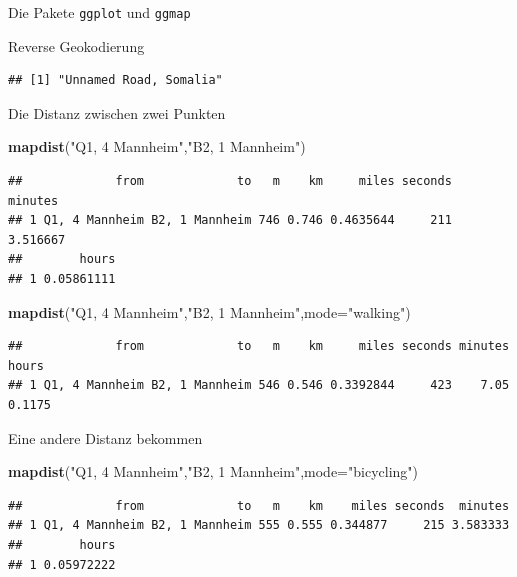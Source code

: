 \documentclass[ignorenonframetext,]{beamer}
\newenvironment{Shaded}{}{}
\newcommand{\KeywordTok}[1]{\textcolor[rgb]{0.00,0.44,0.13}{\textbf{{#1}}}}
\newcommand{\DataTypeTok}[1]{\textcolor[rgb]{0.56,0.13,0.00}{{#1}}}
\newcommand{\StringTok}[1]{\textcolor[rgb]{0.25,0.44,0.63}{{#1}}}
\newcommand{\NormalTok}[1]{{#1}}
\begin{document}
\begin{frame}[fragile]{Die Pakete \texttt{ggplot} und \texttt{ggmap}}
\begin{block}{Reverse Geokodierung}
\begin{verbatim}
## [1] "Unnamed Road, Somalia"
\end{verbatim}

\end{block}

\begin{block}{Die Distanz zwischen zwei Punkten}

\begin{Shaded}
\begin{Highlighting}[]
\KeywordTok{mapdist}\NormalTok{(}\StringTok{"Q1, 4 Mannheim"}\NormalTok{,}\StringTok{"B2, 1 Mannheim"}\NormalTok{)}
\end{Highlighting}
\end{Shaded}

\begin{verbatim}
##             from             to   m    km     miles seconds  minutes
## 1 Q1, 4 Mannheim B2, 1 Mannheim 746 0.746 0.4635644     211 3.516667
##        hours
## 1 0.05861111
\end{verbatim}

\begin{Shaded}
\begin{Highlighting}[]
\KeywordTok{mapdist}\NormalTok{(}\StringTok{"Q1, 4 Mannheim"}\NormalTok{,}\StringTok{"B2, 1 Mannheim"}\NormalTok{,}\DataTypeTok{mode=}\StringTok{"walking"}\NormalTok{)}
\end{Highlighting}
\end{Shaded}

\begin{verbatim}
##             from             to   m    km     miles seconds minutes  hours
## 1 Q1, 4 Mannheim B2, 1 Mannheim 546 0.546 0.3392844     423    7.05 0.1175
\end{verbatim}

\end{block}

\begin{block}{Eine andere Distanz bekommen}

\begin{Shaded}
\begin{Highlighting}[]
\KeywordTok{mapdist}\NormalTok{(}\StringTok{"Q1, 4 Mannheim"}\NormalTok{,}\StringTok{"B2, 1 Mannheim"}\NormalTok{,}\DataTypeTok{mode=}\StringTok{"bicycling"}\NormalTok{)}
\end{Highlighting}
\end{Shaded}

\begin{verbatim}
##             from             to   m    km    miles seconds  minutes
## 1 Q1, 4 Mannheim B2, 1 Mannheim 555 0.555 0.344877     215 3.583333
##        hours
## 1 0.05972222
\end{verbatim}


\end{block}
\end{frame}
\end{document}
